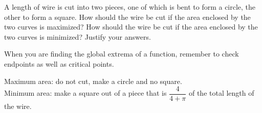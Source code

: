 \begin{Mquestion}[2011H]
A length of wire is cut into two pieces, one of which is bent
to form a circle, the other to form a square. How should the wire be cut
if the area enclosed by the two curves is maximized?
How should the wire be cut
if the area enclosed by the two curves is minimized? Justify your answers.
\end{Mquestion}
\begin{hint}
When you are finding the global extrema of a function, remember to check endpoints as well as critical points.
\end{hint}
\begin{answer}
Maximum area: do not cut, make a circle and no square.\\ Minimum area: make a square out of a piece that is $\dfrac{4}{4+\pi}$ of the total length of the wire.
\end{answer}
